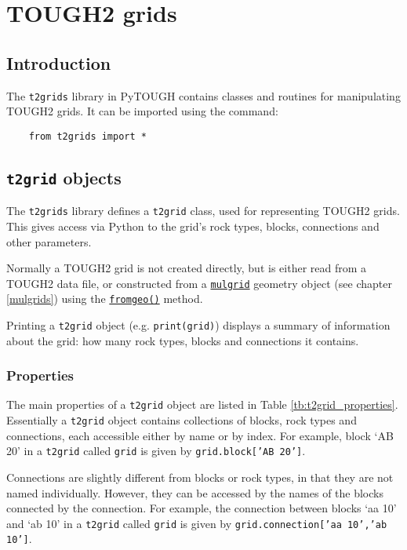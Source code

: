 \chapter{TOUGH2 grids}
\label{t2grids}

\section{Introduction}
The \texttt{t2grids} library in PyTOUGH contains classes and routines for manipulating TOUGH2 grids.  It can be imported using the command:

\begin{lstlisting}
    from t2grids import *
\end{lstlisting}

\section{\texttt{t2grid} objects}

The \texttt{t2grids} library defines a \texttt{t2grid} class, used for representing TOUGH2 grids.  This gives access via Python to the grid's rock types, blocks, connections and other parameters.

Normally a TOUGH2 grid is not created directly, but is either read from a TOUGH2 data file, or constructed from a \hyperref[mulgrids]{\texttt{mulgrid}} geometry object (see chapter \ref{mulgrids}) using the \hyperref[sec:t2grid:fromgeo]{\texttt{fromgeo()}} method.

Printing a \texttt{t2grid} object (e.g. \texttt{print(grid)}) displays a summary of information about the grid: how many rock types, blocks and connections it contains.

\subsection{Properties}

The main properties of a \texttt{t2grid} object are listed in Table \ref{tb:t2grid_properties}.  Essentially a \texttt{t2grid} object contains collections of blocks, rock types and connections, each accessible either by name or by index.  For example, block `AB 20' in a \texttt{t2grid} called \texttt{grid} is given by \texttt{grid.block['AB 20']}.

Connections are slightly different from blocks or rock types, in that they are not named individually.  However, they can be accessed by the names of the blocks connected by the connection.  For example, the connection between blocks `aa 10' and `ab 10' in a \texttt{t2grid} called \texttt{grid} is given by \texttt{grid.connection['aa 10','ab 10']}.

